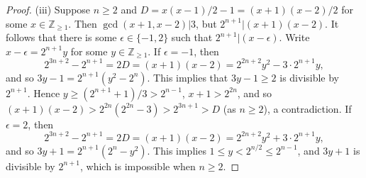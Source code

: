 \documentclass[11pt]{amsart}
\makeatletter
\theoremstyle{plain}
\theoremstyle{definition}
\numberwithin{thm}{section}
\numberwithin{equation}{thm}
\newcommand{\eps}{\epsilon}
\newcommand{\Z}{{\mathbb Z}}
\newcommand{\0}{\emptyset}
\let\@@pmod\pmod
\DeclareRobustCommand{\pmod}{\@ifstar\@pmods\@@pmod}
\def\@pmods#1{\mkern4mu({\operator@font mod}\mkern 6mu#1)}
\makeatother
\begin{document}
\begin{proof}
\smallskip
(iii) Suppose $n \geq 2$ and $D=x(x-1)/2-1 = (x+1)(x-2)/2$ for some $x \in \Z_{\geq 1}$. 
Then $\gcd(x+1,x-2)|3$, but $2^{n+1}|(x+1)(x-2)$. It follows that there is some $\eps \in \{-1,2\}$ such that
$2^{n+1}|(x-\eps)$. Write $x-\eps = 2^{n+1}y$ for some $y \in \Z_{\geq 1}$. If $\eps=-1$, then
$$2^{3n+2}-2^{n+1} = 2D = (x+1)(x-2)=2^{2n+2}y^2-3\cdot2^{n+1}y,$$
and so $3y-1 = 2^{n+1}(y^2-2^{n})$. This implies that $3y-1 \geq 2$ is divisible by $2^{n+1}$. Hence 
$y \geq (2^{n+1}+1)/3 > 2^{n-1}$, $x+1 > 2^{2n}$,
and so $(x+1)(x-2) > 2^{2n}(2^{2n}-3) >2^{3n+1}> D$ (as $n \geq 2$), a contradiction.
If $\eps=2$, then
$$2^{3n+2}-2^{n+1} = 2D = (x+1)(x-2)=2^{2n+2}y^2+ 3 \cdot 2^{n+1}y,$$
and so $3y+1 = 2^{n+1}(2^{n}-y^2)$. This implies $1 \leq y < 2^{n/2} \leq 2^{n-1}$, and $3y+1$ is divisible by $2^{n+1}$, which is impossible when $n \geq 2$.
%
%

\end{proof}
\end{document}
